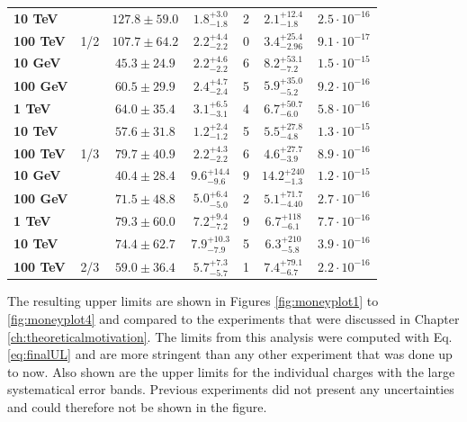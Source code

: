 \begin{table}[]
{\begin{tabular}{|l |c|c|c|c|c|c|}
\textbf{10 TeV} &  & $127.8 \pm 59.0$ & $1.8^{+3.0}_{-1.8}$ & 2 & ${2.1} ^{+12.4} _{-1.8}$ & $2.5 \cdot 10^{-16}$ \\ \cline{3-7}
\textbf{100 TeV} & \multirow{-5}{*}{1/2} & $107.7 \pm 64.2$ & $2.2^{+4.4}_{-2.2}$ & 0 & ${3.4} ^{+25.4} _{-2.96 }$ & $9.1 \cdot 10^{-17}$ \\ \hline
\textbf{10 GeV} &  & $45.3 \pm 24.9$ & $2.2^{+4.6}_{-2.2}$ & 6 & ${8.2} ^{+53.1} _{-7.2}$ & $1.5 \cdot 10^{-15}$ \\ \cline{3-7}
\textbf{100 GeV} &  & $60.5 \pm 29.9$ & $2.4^{+4.7}_{-2.4}$ & 5 & ${5.9} ^{+35.0} _{-5.2}$ & $9.2 \cdot 10^{-16}$ \\ \cline{3-7}
\textbf{1 TeV} &  & $64.0 \pm 35.4$ & $3.1^{+6.5}_{-3.1}$ & 4 & ${6.7} ^{+50.7} _{-6.0}$ & $5.8 \cdot 10^{-16}$ \\ \cline{3-7}
\textbf{10 TeV} &  & $57.6 \pm 31.8$ & $1.2^{+2.4}_{-1.2}$ & 5 & ${5.5} ^{+27.8} _{-4.8}$ & $1.3 \cdot 10^{-15}$ \\ \cline{3-7}
\textbf{100 TeV }& \multirow{-5}{*}{1/3} & $79.7 \pm 40.9$ & $2.2^{+4.3}_{-2.2}$ & 6 & ${4.6} ^{+27.7} _{-3.9}$ & $8.9 \cdot 10^{-16}$ \\ \hline
\textbf{10 GeV} &  & $40.4 \pm 28.4$ & $9.6^{+14.4}_{-9.6}$ & 9 & ${14.2} ^{+240} _{-1.3}$ & $1.2 \cdot 10^{-15}$ \\ \cline{3-7}
\textbf{100 GeV} &  & $71.5 \pm 48.8$ & $5.0^{+6.4}_{-5.0}$ & 2 & ${5.1} ^{+71.7 } _{-4.40}$ & $2.7 \cdot 10^{-16}$ \\ \cline{3-7}
\textbf{1 TeV} &  & $79.3 \pm 60.0$ & $7.2^{+9.4}_{-7.2}$ & 9 & ${6.7} ^{+118} _{-6.1}$ & $7.7 \cdot 10^{-16}$ \\ \cline{3-7}
\textbf{10 TeV} &  & $74.4 \pm 62.7$ & $7.9^{+10.3}_{-7.9}$ & 5 & ${6.3} ^{+210 } _{-5.8}$ & $3.9 \cdot 10^{-16}$ \\ \cline{3-7}
\textbf{100 TeV} & \multirow{-5}{*}{2/3} & $59.0 \pm 36.4$ & $5.7^{+7.3}_{-5.7}$ & 1 & ${7.4}^{+79.1} _{-6.7}$ & $2.2 \cdot 10^{-16}$ \\ \hline
\end{tabular}%
}
\end{table}

\noindent The resulting upper limits are shown in Figures \ref{fig:moneyplot1} to \ref{fig:moneyplot4} and compared to the experiments that were discussed in Chapter \ref{ch:theoreticalmotivation}. The limits from this analysis were computed with Eq. \ref{eq:finalUL} and are more stringent than any other experiment that was done up to now. Also shown are the upper limits for the individual charges with the large systematical error bands. Previous experiments did not present any uncertainties and could therefore not be shown in the figure.

